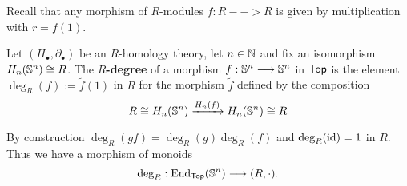 
	Recall that any morphism of $R$-modules $f:R --> R$ is given by multiplication with $r = f(1)$.

	\begin{definition}
		Let $(H_\bullet,\partial_\bullet)$ be an $R$-homology theory, let $n \in \N$ and fix an isomorphism $H_n(\S^n) \isom R$. The \textbf{$R$-degree} of a morphism $f:\S^n --> \S^n$ in $\ncat{Top}$ is the element $\deg_R(f) := \tilde{f}(1)$ in $R$ for the morphism $\tilde f$ defined by the composition
		\begin{equation*}
			R \isom H_n(\S^n) \xrightarrow{H_n(f)} {H}_n(\S^n)\isom R
		\end{equation*}

		By construction $\deg_R(gf) = \deg_R(g)\deg_R(f)$ and $\deg_R(\id) = 1$ in $R$. Thus we have a morphism of monoids
		\begin{equation*}
			\deg_R: \End_\ncat{Top}(\S^n) \longrightarrow (R,\cdot).
		\end{equation*}
	\end{definition}





